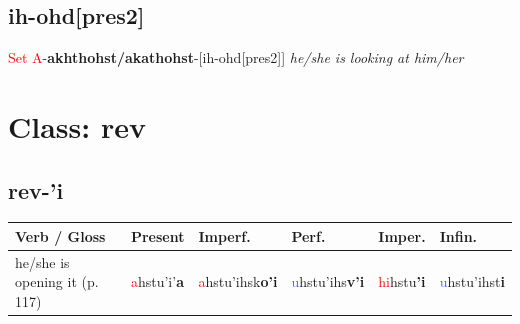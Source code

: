 \documentclass[oneside,openany]{book}%
\begin{document}
\subsection*{ih-ohd[pres2]}%
\textcolor{Red}{Set A}{-}\textbf{akhthohst/akathohst}{-}[ih-ohd[pres2]] \textit{ he/she is looking at him/her} \\%
\vspace{1em}%
\needspace{3in}%
\section*{Class: rev}%
%
\needspace{1in}%
\subsection*{rev-'i}%
\begin{tabularx}{\textwidth}{>{\hsize=1.5\hsize\RaggedRight}X >{\hsize=0.9\hsize}X >{\hsize=0.9\hsize}X >{\hsize=0.9\hsize}X >{\hsize=0.9\hsize}X >{\hsize=0.9\hsize}X}%
\toprule%
\textbf{Verb / Gloss}&\textbf{Present}&\textbf{Imperf.}&\textbf{Perf.}&\textbf{Imper.}&\textbf{Infin.}\\%
\midrule%
he/she is opening it (p. 117)&\textcolor{Red}{a}hstu'i'\textbf{a}&\textcolor{Red}{a}hstu'ihsk\textbf{o'i}&\textcolor{RoyalBlue}{u}hstu'ihs\textbf{v'i}&\textcolor{Red}{hi}hstu\textbf{'i}&\textcolor{RoyalBlue}{u}hstu'ihst\textbf{i}\\%
\bottomrule%
\end{tabularx}%
\vspace{1em}%
\needspace{1in}%
\end{document}
